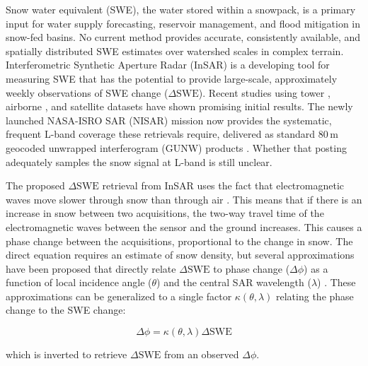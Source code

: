 \documentclass[tc, manuscript]{copernicus}
\begin{document}
\introduction  %
Snow water equivalent (SWE), the water stored within a snowpack, is a primary input for water supply forecasting, reservoir management, and flood mitigation in snow-fed basins. No current method provides accurate, consistently available, and spatially distributed SWE estimates over watershed scales in complex terrain. Interferometric Synthetic Aperture Radar (InSAR) is a developing tool for measuring SWE that has the potential to provide large-scale, approximately weekly observations of SWE change ($\Delta\mathrm{SWE}$). Recent studies using tower \citep{Leinss2015, Ruiz2021}, airborne \citep{Marshall2021, Nagler2022, Tarricone2023, Hoppinen2023w2, palomaki2025spatiotemporal-df9, Bonnell2024}, and satellite \citep{Belinska2022, Oveisgharan2024, ruiz2024} datasets have shown promising initial results. The newly launched NASA-ISRO SAR (NISAR) mission now provides the systematic, frequent L-band coverage these retrievals require, delivered as standard 80\,\unit{m} geocoded unwrapped interferogram (GUNW) products \citep{rosen2017nasa-isro-baa}. Whether that posting adequately samples the snow signal at L-band is still unclear.

The proposed $\Delta\mathrm{SWE}$ retrieval from InSAR uses the fact that electromagnetic waves move slower through snow than through air \citep{Guneriussen2001, Leinss2015}. This means that if there is an increase in snow between two acquisitions, the two-way travel time of the electromagnetic waves between the sensor and the ground increases. This causes a phase change between the acquisitions, proportional to the change in snow. The direct equation requires an estimate of snow density, but several approximations have been proposed that directly relate $\Delta\mathrm{SWE}$ to phase change ($\Delta\phi$) as a function of local incidence angle ($\theta$) and the central SAR wavelength ($\lambda$) \citep{Leinss2015, Oveisgharan2024}. These approximations can be generalized to a single factor $\kappa(\theta,\lambda)$ relating the phase change to the SWE change:

\begin{equation}\label{eq:dswe2dphi}
    \Delta\phi = \kappa (\theta, \lambda) \Delta\mathrm{SWE}
\end{equation}

\noindent which is inverted to retrieve $\Delta\mathrm{SWE}$ from an observed $\Delta\phi$.
\end{document}
